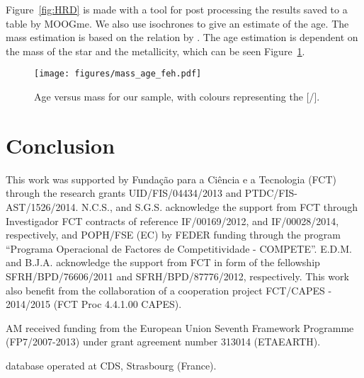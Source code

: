 \documentclass{aa}
\begin{document}
Figure~\ref{fig:HRD} is made with a tool for post processing the results
saved to a table by MOOGme. We also use isochrones \citep{Morton2015}
to give an estimate of the age. The mass estimation is based on the relation
by \citet{Torres2010}. The age estimation is dependent on the mass of the
star and the metallicity, which can be seen Figure~\ref{fig:age}.

\begin{figure}[tpb]
    \centering
    \texttt{[image: figures/mass\_age\_feh.pdf]}
    \caption{Age versus mass for our sample, with colours representing the
    [/].}
    \label{fig:age}
\end{figure}



\section{Conclusion}
\label{sec:conclusion}




\begin{acknowledgements}

This work was supported by Funda\c{c}\~ao para a Ci\^encia e a
Tecnologia (FCT) through the research grants UID/FIS/04434/2013 and
PTDC/FIS-AST/1526/2014. N.C.S., and S.G.S. acknowledge the support from
FCT through Investigador FCT contracts of reference IF/00169/2012, and
IF/00028/2014, respectively, and POPH/FSE (EC) by FEDER funding through
the program “Programa Operacional de Factores de Competitividade
- COMPETE”. E.D.M. and B.J.A. acknowledge the support from FCT in
form of the fellowship SFRH/BPD/76606/2011 and SFRH/BPD/87776/2012,
respectively. This work also benefit from the collaboration of a
cooperation project FCT/CAPES - 2014/2015 (FCT Proc 4.4.1.00 CAPES).

AM received funding from the European Union Seventh Framework Programme
(FP7/2007-2013) under grant agreement number 313014 (ETAEARTH).


 database operated at CDS,
Strasbourg (France).

\end{acknowledgements}




\end{document}
